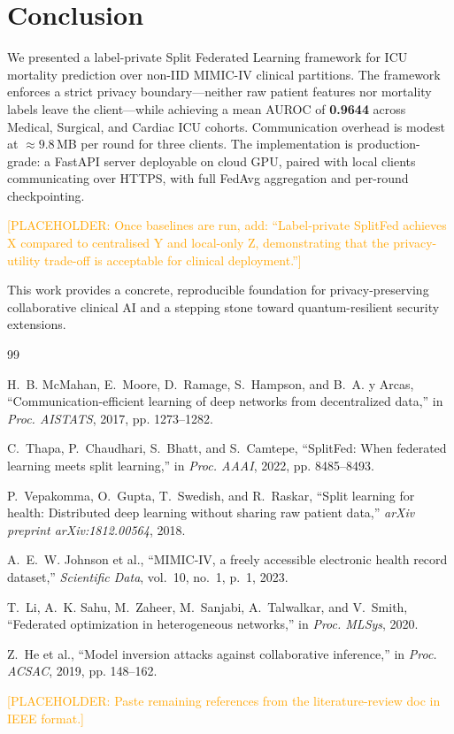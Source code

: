 \documentclass[10pt,twocolumn]{article}
\newcommand{\placeholder}[1]{\textcolor{orange}{[PLACEHOLDER: #1]}}
\begin{document}
\section{Conclusion}
\label{sec:conclusion}

We presented a label-private Split Federated Learning framework for
ICU mortality prediction over non-IID MIMIC-IV clinical partitions.
The framework enforces a strict privacy boundary---neither raw patient
features nor mortality labels leave the client---while achieving a mean
AUROC of \textbf{0.9644} across Medical, Surgical, and Cardiac ICU
cohorts.  Communication overhead is modest at ${\approx}9.8$\,MB per
round for three clients.  The implementation is production-grade: a
FastAPI server deployable on cloud GPU, paired with local clients
communicating over HTTPS, with full FedAvg aggregation and per-round
checkpointing.

\placeholder{Once baselines are run, add: ``Label-private SplitFed
achieves X compared to centralised Y and local-only Z, demonstrating
that the privacy-utility trade-off is acceptable for clinical
deployment.''}

This work provides a concrete, reproducible foundation for
privacy-preserving collaborative clinical AI and a stepping stone
toward quantum-resilient security extensions.


\begin{thebibliography}{99}

H.~B. McMahan, E.~Moore, D.~Ramage, S.~Hampson, and B.~A. y Arcas,
``Communication-efficient learning of deep networks from decentralized
data,'' in \emph{Proc. AISTATS}, 2017, pp. 1273--1282.

C.~Thapa, P.~Chaudhari, S.~Bhatt, and S.~Camtepe, ``SplitFed: When
federated learning meets split learning,'' in \emph{Proc. AAAI}, 2022,
pp. 8485--8493.

P.~Vepakomma, O.~Gupta, T.~Swedish, and R.~Raskar, ``Split learning
for health: Distributed deep learning without sharing raw patient
data,'' \emph{arXiv preprint arXiv:1812.00564}, 2018.

A.~E.~W. Johnson et al., ``MIMIC-IV, a freely accessible electronic
health record dataset,'' \emph{Scientific Data}, vol.~10, no.~1,
p.~1, 2023.

T.~Li, A.~K. Sahu, M.~Zaheer, M.~Sanjabi, A.~Talwalkar, and V.~Smith,
``Federated optimization in heterogeneous networks,'' in
\emph{Proc. MLSys}, 2020.

Z.~He et al., ``Model inversion attacks against collaborative
inference,'' in \emph{Proc. ACSAC}, 2019, pp. 148--162.

\placeholder{Paste remaining references from the literature-review doc
in IEEE format.}

\end{thebibliography}
\end{document}
